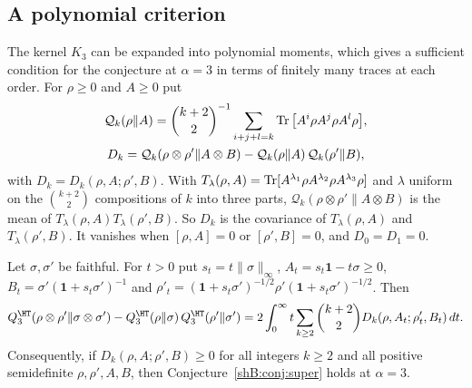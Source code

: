 \subsection*{A polynomial criterion}

The kernel $K_3$ can be expanded into polynomial moments, which gives a sufficient condition for the conjecture at $\alpha=3$ in terms of finitely many traces at each order. For $\rho\ge0$ and $A\ge0$ put
\begin{gather*}
\mathcal Q_k(\rho\|A)=\binom{k+2}2^{-1}\sum_{i+j+l=k}\operatorname{Tr}\big[A^i\rho A^j\rho A^l\rho\big],\\
 D_k=\mathcal Q_k(\rho\otimes\rho'\|A\otimes B)-\mathcal Q_k(\rho\|A)\,\mathcal Q_k(\rho'\|B),
\end{gather*}
with $D_k=D_k(\rho,A;\rho',B)$.
With $T_\lambda(\rho,A)=\operatorname{Tr}[A^{\lambda_1}\rho A^{\lambda_2}\rho A^{\lambda_3}\rho]$ and $\lambda$ uniform on the $\binom{k+2}2$ compositions of $k$ into three parts, $\mathcal Q_k(\rho\otimes\rho'\|A\otimes B)$ is the mean of $T_\lambda(\rho,A)T_\lambda(\rho',B)$. So $D_k$ is the covariance of $T_\lambda(\rho,A)$ and $T_\lambda(\rho',B)$. It vanishes when $[\rho,A]=0$ or $[\rho',B]=0$, and $D_0=D_1=0$.

\begin{theorem}\label{shB:thm:polycrit}
Let $\sigma,\sigma'$ be faithful. For $t>0$ put $s_t=t\|\sigma\|_\infty$, $A_t=s_t\mathbf 1-t\sigma\ge0$, $B_t=\sigma'(\mathbf 1+s_t\sigma')^{-1}$ and $\rho'_t=(\mathbf 1+s_t\sigma')^{-1/2}\rho'(\mathbf 1+s_t\sigma')^{-1/2}$. Then
\[
Q^\HT_3(\rho\otimes\rho'\|\sigma\otimes\sigma')-Q^\HT_3(\rho\|\sigma)\,Q^\HT_3(\rho'\|\sigma')=2\int_0^\infty t\sum_{k\ge2}\binom{k+2}2D_k(\rho,A_t;\rho'_t,B_t)\,dt .
\]
Consequently, if $D_k(\rho,A;\rho',B)\ge0$ for all integers $k\ge2$ and all positive semidefinite $\rho,\rho',A,B$, then Conjecture~\ref{shB:conj:super} holds at $\alpha=3$.
\end{theorem}

